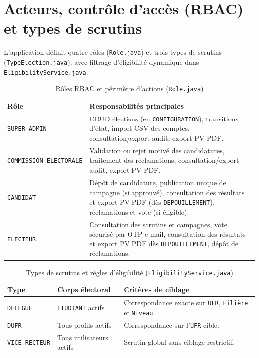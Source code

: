 \section{Acteurs, contrôle d'accès (RBAC) et types de scrutins}

L'application définit quatre rôles (\texttt{Role.java}) et trois types de scrutins (\texttt{TypeElection.java}), avec filtrage d'éligibilité dynamique dans \texttt{EligibilityService.java}.

\begin{table}[H]
\centering
\caption{Rôles RBAC et périmètre d'actions (\texttt{Role.java})}
\label{tab:rbac}
\small
\begin{tabularx}{\textwidth}{@{}lX@{}}
\toprule
\rowcolor{uaszlight}
\textbf{Rôle} & \textbf{Responsabilités principales} \\
\midrule
\texttt{SUPER\_ADMIN} & CRUD élections (en \texttt{CONFIGURATION}), transitions d'état, import CSV des comptes, consultation/export audit, export PV PDF. \\
\texttt{COMMISSION\_ELECTORALE} & Validation ou rejet motivé des candidatures, traitement des réclamations, consultation/export audit, export PV PDF. \\
\texttt{CANDIDAT} & Dépôt de candidature, publication unique de campagne (si approuvé), consultation des résultats et export PV PDF (dès \texttt{DEPOUILLEMENT}), réclamations et vote (si éligible). \\
\texttt{ELECTEUR} & Consultation des scrutins et campagnes, vote sécurisé par OTP e-mail, consultation des résultats et export PV PDF dès \texttt{DEPOUILLEMENT}, dépôt de réclamations. \\
\bottomrule
\end{tabularx}
\end{table}

\begin{table}[H]
\centering
\caption{Types de scrutins et règles d'éligibilité (\texttt{EligibilityService.java})}
\label{tab:types-scrutins}
\small
\begin{tabularx}{\textwidth}{@{}llX@{}}
\toprule
\rowcolor{uaszlight}
\textbf{Type} & \textbf{Corps électoral} & \textbf{Critères de ciblage} \\
\midrule
\texttt{DELEGUE} & \texttt{ETUDIANT} actifs & Correspondance exacte sur \texttt{UFR}, \texttt{Filière} et \texttt{Niveau}. \\
\texttt{DUFR} & Tous profils actifs & Correspondance sur l'\texttt{UFR} cible. \\
\texttt{VICE\_RECTEUR} & Tous utilisateurs actifs & Scrutin global sans ciblage restrictif. \\
\bottomrule
\end{tabularx}
\end{table}

